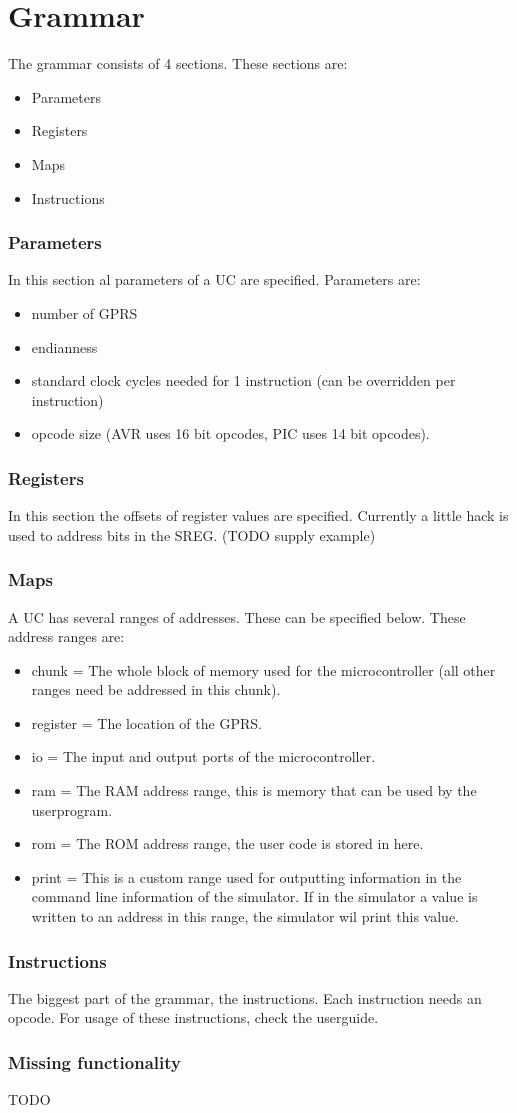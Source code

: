 \chapter{Grammar}

The grammar consists of 4 sections. These sections are:
\begin{itemize}
\item Parameters
\item Registers
\item Maps
\item Instructions
\end{itemize}

\subsection{Parameters}
In this section al parameters of a \ac{UC} are specified. Parameters are: 

\begin{itemize}
\item number of \ac{GPRS} 
\item endianness
\item standard clock cycles needed for 1 instruction (can be overridden per instruction)
\item opcode size (AVR uses 16 bit opcodes, PIC uses 14 bit opcodes).
\end{itemize} 

\subsection{Registers}
In this section the offsets of register values are specified. Currently a little hack is used to address bits in the \ac{SREG}. (TODO supply example)

\subsection{Maps}
A \ac{UC} has several ranges of addresses. These can be specified below. These address ranges are:
\begin{itemize}
\item chunk = The whole block of memory used for the microcontroller (all other ranges need be addressed in this chunk).
\item register = The location of the \ac{GPRS}.
\item io = The input and output ports of the microcontroller.
\item ram = The \ac{RAM} address range, this is memory that can be used by the userprogram.
\item rom = The \ac{ROM} address range, the user code is stored in here. 
\item print = This is a custom range used for outputting information in the command line information of the simulator. If in the simulator a value is written to an address in this range, the simulator wil print this value.
\end{itemize}

\subsection{Instructions}
The biggest part of the grammar, the instructions. Each instruction needs an opcode. For usage of these instructions, check the userguide.

\subsection{Missing functionality}
TODO
